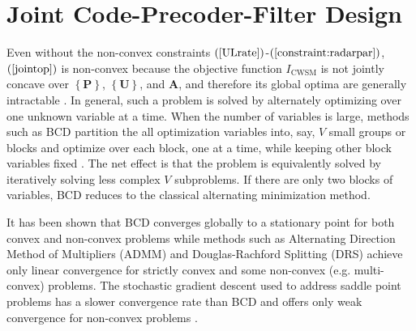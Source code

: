 \documentclass[10pt,journal]{IEEEtran}
\newcommand{\paren}[1]{\left({#1}\right)}
\newcommand{\braces}[1]{{\left\{ {#1}\right\}}}
\theoremstyle{definition}
\begin{document}
	\section{Joint Code-Precoder-Filter Design}
	\label{sec:solution}
	Even without the non-convex constraints $\paren{\mathrm{\ref{ULrate}}}$-$\paren{\mathrm{\ref{constraint:radarpar}}}$, $\paren{\mathrm{\ref{jointop}}}$ is non-convex because the objective function $\mathit{I}_{\textrm{CWSM}}$ is not jointly concave over ${\braces{\mathbf{P}}}$, $\braces{\mathbf{U}}$, and $\mathbf{A}$, and therefore its global optima are generally intractable \cite{Lui2006subg}. In general, such a problem is solved by alternately optimizing over one unknown variable at a time. When the number of variables is large, methods such as BCD partition the all optimization variables into, say, $V$ small groups or blocks and optimize over each block, one at a time, while keeping other block variables fixed \cite{BCDconvergence}. The net effect is that the problem is equivalently solved by iteratively solving less complex $V$ subproblems. %
	If there are only two blocks of variables, BCD reduces to the classical alternating minimization method\cite{BCDconvergence,Liu2017asilomar}.  %
	
	It has been shown \cite{ADMMBCD,zhang2017convergent} that BCD converges globally to a stationary point for both convex and non-convex problems while methods such as Alternating Direction Method of Multipliers (ADMM) and Douglas-Rachford Splitting (DRS) achieve only linear convergence for strictly convex and some non-convex (e.g. multi-convex) problems. The stochastic gradient descent used to address saddle point problems has a slower convergence rate than BCD and offers only weak convergence for non-convex problems \cite{zhang2017convergent}. 
	
\end{document}
